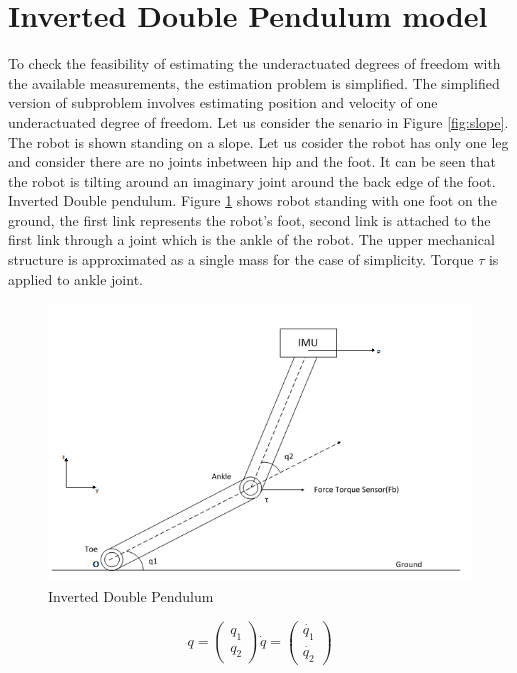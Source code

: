 \section{Inverted Double Pendulum model} 
To check the feasibility of estimating the underactuated degrees of freedom with the available measurements, the estimation problem is simplified. The simplified version of subproblem involves estimating position and velocity of one underactuated degree of freedom. Let us consider the senario in Figure \ref{fig:slope}. The robot is shown standing on a slope. Let us cosider the robot has only one leg and consider there are no joints inbetween hip and the foot. It can be seen that the robot is tilting around an imaginary joint around the back edge of the foot. Inverted Double pendulum.  Figure \ref{fig:idp} shows robot standing with one foot on the ground, the first link represents the robot's foot, second link is attached to the first link through a joint which is the ankle of the robot. The upper mechanical structure is approximated as a single mass for the case of simplicity. Torque $\tau$ is applied to ankle joint. 
\begin{figure}
	\centering
	\includegraphics[scale=0.75]{Bilder/doublePendulum1.png}
	\caption{Inverted Double Pendulum}	
	\label{fig:idp}
\end{figure}
\begin{equation}
	 q = 
	\begin{pmatrix}
		q_{1}\\
		q_{2}
	\end{pmatrix}
	 \dot{q} = 
	\begin{pmatrix}
		\dot{q_{1}}\\
		\dot{q_{2}}
	\end{pmatrix}
\end{equation}

